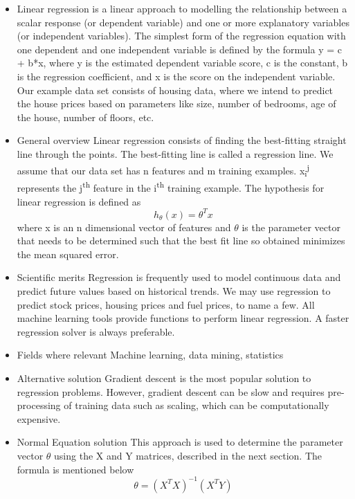 \documentclass{article}
\begin{document}
\begin{spacing}{1.1}
\begin{itemize}
    \item Linear regression is a linear approach to modelling the relationship between a scalar response (or dependent variable) and one or more explanatory variables (or independent variables). The simplest form of the regression equation with one dependent and one independent variable is defined by the formula y = c + b*x, where y is the estimated dependent variable score, c is the constant, b is the regression coefficient, and x is the score on the independent variable. Our example data set consists of housing data, where we intend to predict the house prices based on parameters like size, number of bedrooms, age of the house, number of floors, etc.
    \item General overview \newline
    Linear regression consists of finding the best-fitting straight line through the points. The best-fitting line is called a regression line. We assume that our data set has n features and m training examples. x\textsubscript{i}\textsuperscript{j} represents the j\textsuperscript{th} feature in the i\textsuperscript{th} training example. The hypothesis for linear regression is defined as $$h_\theta(x)=\theta^Tx$$ where x is an n dimensional vector of features and $\theta$ is the parameter vector that needs to be determined such that the best fit line so obtained minimizes the mean squared error.
    \item Scientific merits \newline
    Regression is frequently used to model continuous data and predict future values based on historical trends. We may use regression to predict stock prices, housing prices and fuel prices, to name a few. All machine learning tools provide functions to perform linear regression. A faster regression solver is always preferable.   
    \item Fields where relevant \newline
    Machine learning, data mining, statistics
    \item Alternative solution \newline
    Gradient descent \cite{GDRef} is the most popular solution to regression problems. However, gradient descent can be slow and requires pre-processing of training data such as scaling, which can be computationally expensive.
    \item Normal Equation solution \newline 
    This approach is used to determine the parameter vector $\theta$ using the X and Y matrices, described in the next section. The formula is mentioned below
    $$\theta=(X^TX)^{-1}(X^TY)$$
\end{itemize}


\end{spacing}
\end{document}
